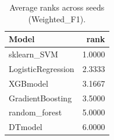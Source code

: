 \begin{table}[t]
\centering
\begin{tabular}{lr}
\toprule
Model & rank \\
\midrule
sklearn_SVM & 1.0000 \\
LogisticRegression & 2.3333 \\
XGBmodel & 3.1667 \\
GradientBoosting & 3.5000 \\
random_forest & 5.0000 \\
DTmodel & 6.0000 \\
\bottomrule
\end{tabular}
\caption{Average ranks across seeds (Weighted_F1).}
\label{tab:avg_rank_Weighted_F1}
\end{table}